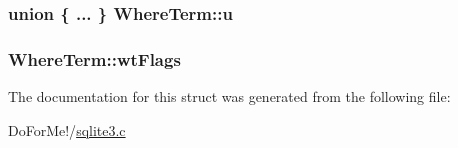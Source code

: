 \hypertarget{struct_where_term_a0b9e1c1bd5894e80be5d8224422b8463}{
\subsubsection[{u}]{\setlength{\rightskip}{0pt plus 5cm}union \{ ... \}   Where\-Term\-::u}}\label{struct_where_term_a0b9e1c1bd5894e80be5d8224422b8463}
\hypertarget{struct_where_term_a5a3ba67885262f1bb9169dcaff0f91b1}{
\subsubsection[{wt\-Flags}]{ Where\-Term\-::wt\-Flags}}\label{struct_where_term_a5a3ba67885262f1bb9169dcaff0f91b1}


The documentation for this struct was generated from the following file\-:\begin{DoxyCompactItemize}
\item 
Do\-For\-Me!/\hyperlink{sqlite3_8c}{sqlite3.\-c}\end{DoxyCompactItemize}
